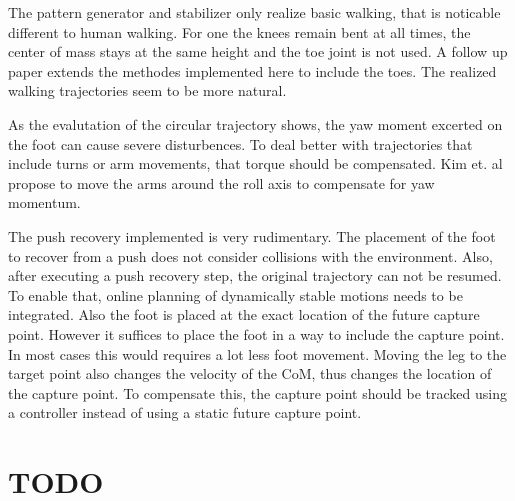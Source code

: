 \documentclass[english,ngerman]{KITreprt}
\begin{document}
The pattern generator and stabilizer only realize basic walking, that is
noticable different to human walking. For one the knees remain bent at
all times, the center of mass stays at the same height and the toe joint
is not used. A follow up paper \cite{kajita2012evaluation} extends the
methodes implemented here to include the toes. The realized walking
trajectories seem to be more natural.

As the evalutation of the circular trajectory shows, the yaw moment
excerted on the foot can cause severe disturbences. To deal better with
trajectories that include turns or arm movements, that torque should be
compensated. Kim et. al \cite{kim2005humanoid} propose to move the arms
around the roll axis to compensate for yaw momentum.

The push recovery implemented is very rudimentary. The placement of the
foot to recover from a push does not consider collisions with the
environment. Also, after executing a push recovery step, the original
trajectory can not be resumed. To enable that, online planning of
dynamically stable motions needs to be integrated. Also the foot is
placed at the exact location of the future capture point. However it
suffices to place the foot in a way to include the capture point. In
most cases this would requires a lot less foot movement. Moving the leg
to the target point also changes the velocity of the CoM, thus changes
the location of the capture point. To compensate this, the capture point
should be tracked using a controller instead of using a static future
capture point.

\chapter{TODO}\label{todo}

\listoftodos




\end{document}
